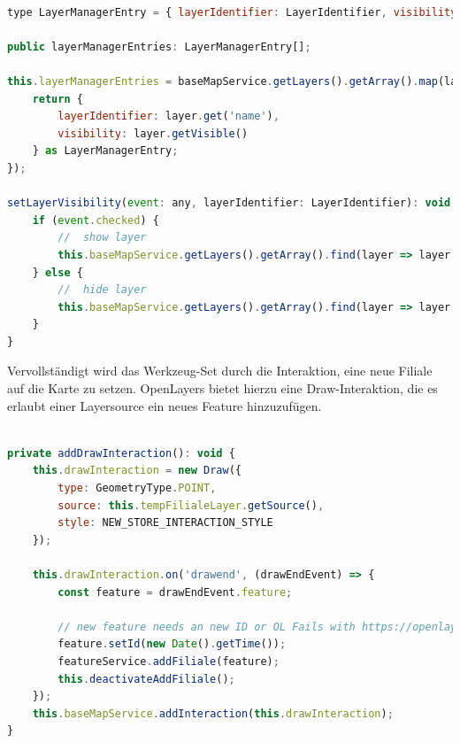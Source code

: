 \begin{lstlisting}[language=JavaScript, caption={Layermanager}]
	
type LayerManagerEntry = { layerIdentifier: LayerIdentifier, visibility: boolean };

public layerManagerEntries: LayerManagerEntry[];

this.layerManagerEntries = baseMapService.getLayers().getArray().map(layer => {
	return {
		layerIdentifier: layer.get('name'),
		visibility: layer.getVisible()
	} as LayerManagerEntry;
});

setLayerVisibility(event: any, layerIdentifier: LayerIdentifier): void {
	if (event.checked) {
		//  show layer
		this.baseMapService.getLayers().getArray().find(layer => layer.get('name') === layerIdentifier).setVisible(true);
	} else {
		//  hide layer
		this.baseMapService.getLayers().getArray().find(layer => layer.get('name') === layerIdentifier).setVisible(false);
	}
}
\end{lstlisting}

Vervollständigt wird das Werkzeug-Set durch die Interaktion, eine neue Filiale auf die Karte zu setzen.
OpenLayers bietet hierzu eine Draw-Interaktion, die es erlaubt einer Layersource ein neues Feature hinzuzufügen.

\begin{lstlisting}[language=JavaScript, caption={Draw-Interaktion}]

private addDrawInteraction(): void {
	this.drawInteraction = new Draw({
		type: GeometryType.POINT,
		source: this.tempFilialeLayer.getSource(),
		style: NEW_STORE_INTERACTION_STYLE
	});
	
	this.drawInteraction.on('drawend', (drawEndEvent) => {
		const feature = drawEndEvent.feature;
		
		// new feature needs an new ID or OL Fails with https://openlayers.org/en/v6.3.1/doc/errors/#30
		feature.setId(new Date().getTime());
		featureService.addFiliale(feature);
		this.deactivateAddFiliale();
	});
	this.baseMapService.addInteraction(this.drawInteraction);
}
\end{lstlisting}

